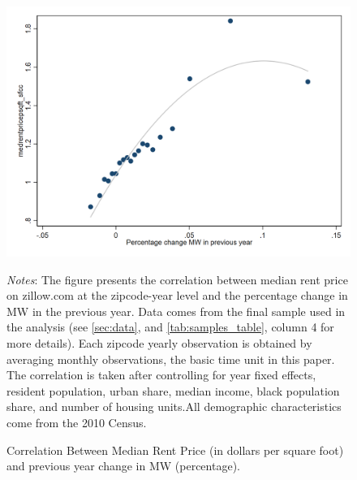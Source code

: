 \begin{figure}[htb]
    \centering
    \caption{Correlation Between Median Rent Price (in dollars per square foot) and previous year change in MW (percentage).}
    \label{fig:binsc_rent_mwpctchange}
    \includegraphics[width=0.75\linewidth]{draft_june20/tempfigure/binsc_medrentpricepsqft_sfcc_pctMWch.png}
    \begin{minipage}{.95\textwidth} \footnotesize
		\vspace{3mm} 
		\textit{Notes}: The figure presents the correlation between median rent price on zillow.com at the zipcode-year level and the percentage change in MW in the previous year. Data comes from the final sample used in the analysis (see \autoref{sec:data}, and \autoref{tab:samples_table}, column 4 for more details). Each zipcode yearly observation is obtained by averaging monthly observations, the basic time unit in this paper. The correlation is taken after controlling for year fixed effects, resident population, urban share, median income, black population share, and number of housing units.All demographic characteristics come from the 2010 Census.
	\end{minipage}
\end{figure}





